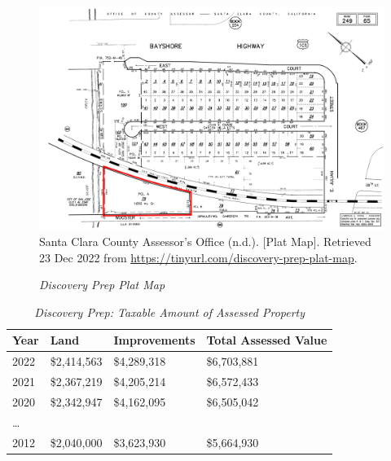 \begin{figure}[hbt]
    \caption[Discovery Prep Plat Map]{\textit{Discovery Prep Plat Map}}\label{fig:discovery-prep-plat-map}
    \includegraphics[width=\textwidth]{Assessor-Info/discovery-prep-plat-map-249-65}\\ %
    \footnotesize{Santa Clara County Assessor's Office (n.d.). [Plat Map]. Retrieved 23 Dec 2022 from  \url{https://tinyurl.com/discovery-prep-plat-map}}.
\end{figure}

\begin{table}[hbt]
  \SingleSpacing%
  \caption[Discovery Prep: Taxable Amount of Assessed Propery]{\textit{Discovery Prep: Taxable Amount of Assessed Property}}\label{tab:discovery-prep-taxable-amount}
  \begin{tabular}{llll}
    \toprule
    Year & Land        & Improvements & Total Assessed Value \\
    \midrule
    2022 & \$2,414,563 & \$4,289,318  & \$6,703,881 \\
    2021 & \$2,367,219 & \$4,205,214  & \$6,572,433 \\
    2020 & \$2,342,947 & \$4,162,095  & \$6,505,042 \\
    \ldots \\
    2012 & \$2,040,000 & \$3,623,930  & \$5,664,930 \\
    \bottomrule
  \end{tabular}
\end{table}

